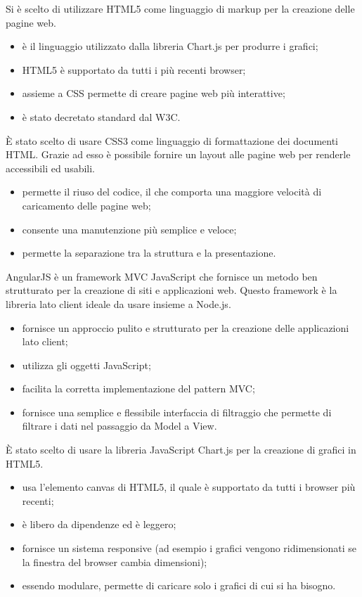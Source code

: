 Si è scelto di utilizzare HTML5 come linguaggio di markup per la creazione delle pagine web.
\begin{itemize}
\item è il linguaggio utilizzato dalla libreria Chart.js per produrre i grafici;
\item HTML5 è supportato da tutti i più recenti browser;
\item assieme a CSS permette di creare pagine web più interattive;
\item è stato decretato standard dal W3C.
\end{itemize}

È stato scelto di usare CSS3 come linguaggio di formattazione dei documenti HTML. Grazie ad esso è possibile fornire un layout alle pagine web per renderle accessibili ed usabili.
\begin{itemize}
\item permette il riuso del codice, il che comporta una maggiore velocità di caricamento delle pagine web;
\item consente una manutenzione più semplice e veloce;
\item permette la separazione tra la struttura e la presentazione.
\end{itemize}

AngularJS è un framework MVC JavaScript che fornisce un metodo ben strutturato per la creazione di siti e applicazioni web. Questo framework è la libreria lato client ideale da usare insieme a Node.js.
\begin{itemize}
\item fornisce un approccio pulito e strutturato per la creazione delle applicazioni lato client;
\item utilizza gli oggetti JavaScript;
\item facilita la corretta implementazione del pattern MVC;
\item fornisce una semplice e flessibile interfaccia di filtraggio che permette di filtrare i dati nel passaggio da Model a View.
\end{itemize}

È stato scelto di usare la libreria JavaScript Chart.js per la creazione di grafici in HTML5.
\begin{itemize}
\item usa l'elemento canvas di HTML5, il quale è supportato da tutti i browser più recenti;
\item è libero da dipendenze ed è leggero;
\item fornisce un sistema responsive (ad esempio i grafici vengono ridimensionati se la finestra del browser cambia dimensioni);
\item essendo modulare, permette di caricare solo i grafici di cui si ha bisogno.
\end{itemize}

